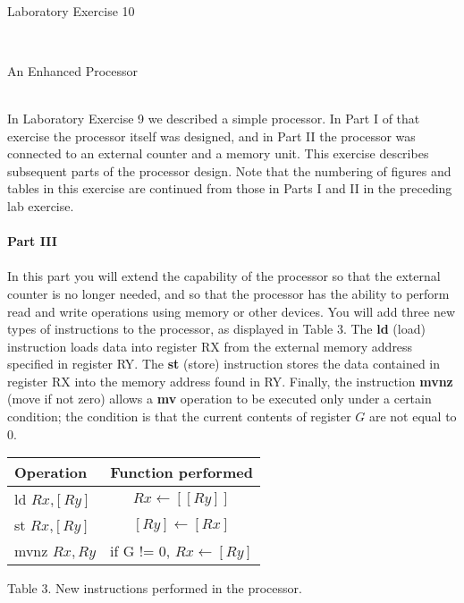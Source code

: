 \documentclass[epsfig,10pt,fullpage]{article}
\begin{document}
~\\
\centerline{\huge Laboratory Exercise 10}
~\\
\centerline{\large An Enhanced Processor}
~\\
\noindent
In Laboratory Exercise 9 we described a simple processor. In
Part I of that exercise the processor itself was designed, and in Part II the processor was
connected to an external counter and a memory unit. This exercise describes subsequent
parts of the processor design. Note that the numbering of figures and tables in this exercise 
are continued from those in Parts I and II in the preceding lab exercise.
~\\
~\\
\noindent
{\bf Part III}
~\\
~\\
\noindent
In this part you will extend the capability of the processor so that the external counter 
is no longer needed, and so that the processor has the ability to perform read and
write operations using memory or other devices. You will add three new types of instructions
to the processor, as displayed in Table 3. The {\bf ld} (load) instruction loads data into register RX
from the external memory address specified in register RY. The {\bf st} (store) instruction
stores the data contained in register RX into the memory address found in RY. Finally, the
instruction {\bf mvnz} (move if not zero) allows a {\bf mv} operation to be executed only under a certain
condition; the condition is that the current contents of register $G$ are not equal to 0.

\begin{center}
\begin{tabular}{l|c}
\rule[-0.075in]{0in}{0.25in}Operation & Function performed \\ \hline 
\rule[-0.075in]{0in}{0.25in}ld $Rx$,$[Ry]$ & $Rx \leftarrow [[Ry]]$ \\ 
\rule[-0.075in]{0in}{0.25in}st $Rx$,$[Ry]$ & $[Ry] \leftarrow [Rx]$ \\ 
\rule[-0.075in]{0in}{0.25in}mvnz $Rx,Ry$ & if G != 0, $Rx \leftarrow [Ry]$ \\ 
\end{tabular}
\end{center}

\begin{center}
Table 3. New instructions performed in the processor.
\end{center}
\end{document}
